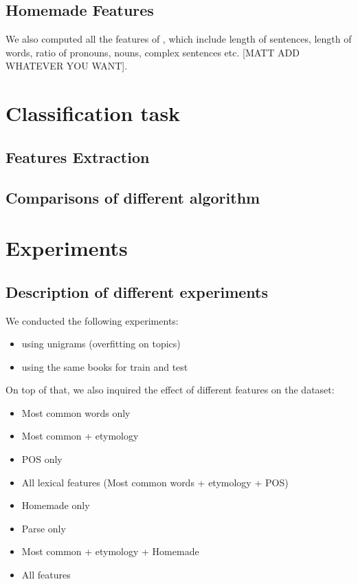 \documentclass[10pt]{article}
\begin{document}
\subsection{Homemade Features}
We also computed all the features of \cite{homemade}, which include length of sentences, length of words, ratio of pronouns, nouns, complex sentences etc. [MATT ADD WHATEVER YOU WANT].

\section{Classification task}
\subsection{Features Extraction}
\subsection{Comparisons of different algorithm}

\section{Experiments}
\subsection{Description of different experiments}
We conducted the following experiments:
\begin{itemize}
\item using unigrams (overfitting on topics)
\item using the same books for train and test
\end{itemize}

On top of that, we also inquired the effect of different features on the dataset:
\begin{itemize}
\item Most common words only
\item Most common + etymology
\item POS only
\item All lexical features (Most common words + etymology + POS)
\item Homemade only
\item Parse only
\item Most common + etymology + Homemade
\item All features
\end{itemize}
\end{document}
